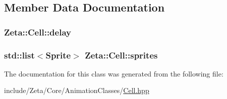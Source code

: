 \subsection{Member Data Documentation}
\hypertarget{classZeta_1_1Cell_a04e89b75d1e55f552f18b0b99d5340ae}{
\subsubsection[{delay}]{ Zeta\+::\+Cell\+::delay\hspace{0.3cm}{\ttfamily [protected]}}}\label{classZeta_1_1Cell_a04e89b75d1e55f552f18b0b99d5340ae}
\hypertarget{classZeta_1_1Cell_aa14a04a512b4577d3af71f9bf0b54731}{
\subsubsection[{sprites}]{\setlength{\rightskip}{0pt plus 5cm}std\+::list$<${\bf Sprite}$>$ Zeta\+::\+Cell\+::sprites\hspace{0.3cm}{\ttfamily [protected]}}}\label{classZeta_1_1Cell_aa14a04a512b4577d3af71f9bf0b54731}


The documentation for this class was generated from the following file\+:\begin{DoxyCompactItemize}
\item 
include/\+Zeta/\+Core/\+Animation\+Classes/\hyperlink{Cell_8hpp}{Cell.\+hpp}\end{DoxyCompactItemize}
